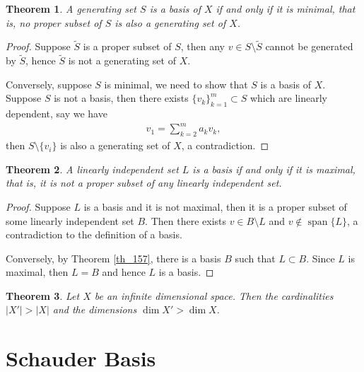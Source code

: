 \documentclass[10pt]{book}
\newtheorem{theorem}{Theorem}[chapter]
\theoremstyle{definition}
\numberwithin{equation}{chapter}
\begin{document}
\begin{theorem}
A generating set $S$ is a basis of $X$ if and only if it is minimal, that is, no proper subset of $S$ is also a generating set of $X$.
\end{theorem}
\begin{proof}
Suppose $\widetilde{S}$ is a proper subset of $S$, then any $v \in S\setminus\widetilde{S}$ cannot be generated by $\widetilde{S}$, hence $\widetilde{S}$ is not a generating set of $X$. 

Conversely, suppose $S$ is minimal, we need to show that $S$ is a basis of $X$. Suppose $S$ is not a basis, then there exists $\{v_k\}^m_{k=1} \subset S$ which are linearly dependent, say we have
\begin{align*}
    v_1 = \sum^m_{k=2} a_k v_k,
\end{align*}
then $S \setminus \{v_i\}$ is also a generating set of $X$, a contradiction.
\end{proof}

\medskip

\begin{theorem}
A linearly independent set $L$ is a basis if and only if it is maximal, that is, it is not a proper subset of any linearly independent set.
\end{theorem}
\begin{proof}
Suppose $L$ is a basis and it is not maximal, then it is a proper subset of some linearly independent set $B$. Then there exists $v \in B \setminus L$ and $v \notin \operatorname{span} \{L\}$, a contradiction to the definition of a basis.

Conversely, by Theorem \ref{th_157}, there is a basis $B$ such that $L \subset B$. Since $L$ is maximal, then $L = B$ and hence $L$ is a basis. 
\end{proof}

\medskip

\begin{theorem}
Let $X$ be an infinite dimensional space. Then the cardinalities $\left|X'\right| > \left|X\right|$ and the dimensions $\dim X' > \dim X$.
\end{theorem}


\medskip


\section{Schauder Basis}
\end{document}
